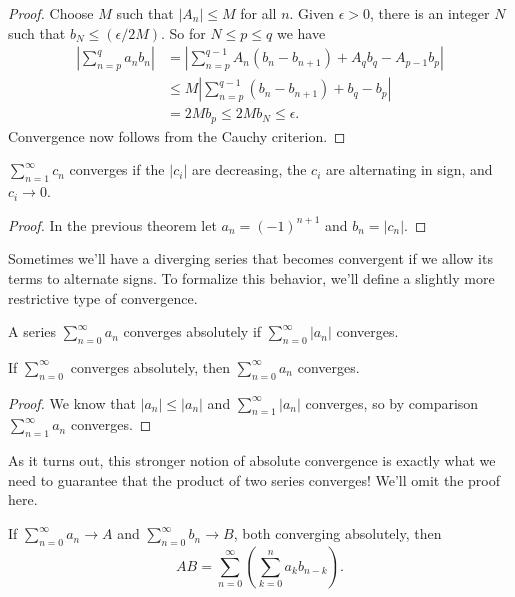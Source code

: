 \documentclass[../m131main.tex]{subfiles}
\begin{document}
\begin{proof}
    Choose $M$ such that $|A_n| \leq M$ for all $n$.
    Given $\epsilon > 0$, there is an integer $N$ such that $b_N \leq (\epsilon / 2M)$.
    So for $N \leq p \leq q$ we have
    \begin{align*}
        \left| \sum_{n=p}^{q}a_nb_n \right| &= \left| \sum_{n=p}^{q-1} A_n (b_n - b_{n+1}) + A_q b_q - A_{p-1} b_p \right| \\
        &\leq M \left| \sum_{n=p}^{q-1} (b_n - b_{n+1}) + b_q - b_p \right| \\
        &= 2Mb_p \leq 2Mb_N \leq \epsilon.
    \end{align*}
    Convergence now follows from the Cauchy criterion.
\end{proof}

\begin{corollary}
    $\sum_{n=1}^{\infty} c_n$ converges if the $|c_i|$ are decreasing, the $c_i$ are alternating in sign, and $c_i \to 0$.
\end{corollary}

\begin{proof}
    In the previous theorem let $a_n = (-1)^{n+1}$ and $b_n = |c_n|$.
\end{proof}

Sometimes we'll have a diverging series that becomes convergent if we allow its terms to alternate signs.
To formalize this behavior, we'll define a slightly more restrictive type of convergence.

\begin{definition}
    A series $\sum_{n=0}^{\infty} a_n$ converges absolutely if $\sum_{n=0}^{\infty} |a_n|$ converges.
\end{definition}

\begin{theorem}[]
    If $\sum_{n=0}^{\infty}$ converges absolutely, then $\sum_{n=0}^{\infty} a_n$ converges.
\end{theorem}

\begin{proof}
    We know that $|a_n| \leq |a_n|$ and $\sum_{n=1}^{\infty} |a_n|$ converges, so by comparison $\sum_{n=1}^{\infty} a_n$ converges.
\end{proof}

As it turns out, this stronger notion of absolute convergence is exactly what we need to guarantee that the product of two series converges!
We'll omit the proof here.

\begin{theorem}[]
    If $\sum_{n=0}^{\infty} a_n \to A$ and $\sum_{n=0}^{\infty} b_n \to B$, both converging absolutely, then
    \[ AB = \sum_{n=0}^{\infty} \left( \sum_{k=0}^{n} a_k b_{n-k} \right). \]
\end{theorem}
\end{document}
